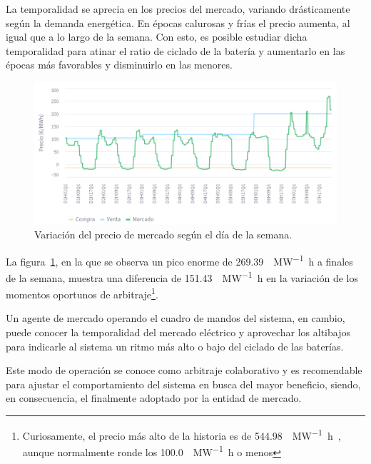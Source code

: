 La temporalidad se aprecia en los precios del mercado, variando drásticamente según la demanda energética. En épocas calurosas y frías el precio aumenta, al igual que a lo largo de la semana. Con esto, es posible estudiar dicha temporalidad para atinar el ratio de ciclado de la batería y aumentarlo en las épocas más favorables y disminuirlo en las menores.

\begin{figure}
  \centering
  \includegraphics[width=0.75\linewidth]{figures/temporalidad-mercado.png}
  \caption[Variación del precio de mercado según el día de la semana.]{Variación del precio de mercado según el día de la semana.}%
  \label{fig:temporalidad-mercado}
\end{figure}

La figura~\ref{fig:temporalidad-mercado}, en la que se observa un pico enorme de \SI{269.39}{\text{\euro}\per\mega\watt\hour} a finales de la semana, muestra una diferencia de \SI{151.43}{\text{\euro}\per\mega\watt\hour} en la variación de los momentos oportunos de arbitraje\footnote{Curiosamente, el precio más alto de la historia es de \SI{544.98}{\text{\euro}\per\mega\watt\hour}~\cite{ecoavant2025precio}, aunque normalmente ronde los \SI{100.0}{\text{\euro}\per\mega\watt\hour} o menos}.

Un agente de mercado operando el cuadro de mandos del sistema, en cambio, puede conocer la temporalidad del mercado eléctrico y aprovechar los altibajos para indicarle al sistema un ritmo más alto o bajo del ciclado de las baterías.

Este modo de operación se conoce como arbitraje colaborativo y es recomendable para ajustar el comportamiento del sistema en busca del mayor beneficio, siendo, en consecuencia, el finalmente adoptado por la entidad de mercado.
